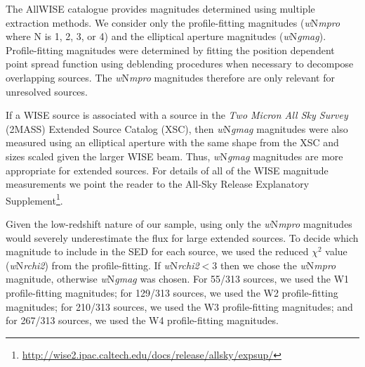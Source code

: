 \documentclass[fleqn, usenatbib]{mnras}
\begin{document}
The AllWISE catalogue provides magnitudes determined using multiple extraction methods. We consider only the profile-fitting magnitudes (\textit{w}N\textit{mpro} where N is 1, 2, 3, or 4) and the elliptical aperture magnitudes (\textit{w}N\textit{gmag}). Profile-fitting magnitudes were determined by fitting the position dependent point spread function using deblending procedures when necessary to decompose overlapping sources. The \textit{w}N\textit{mpro} magnitudes therefore are only relevant for unresolved sources.

If a WISE source is associated with a source in the \textit{Two Micron All Sky Survey} (2MASS) Extended Source Catalog (XSC), then \textit{w}N\textit{gmag} magnitudes were also measured using an elliptical aperture with the same shape from the XSC and sizes scaled given the larger WISE beam. Thus, \textit{w}N\textit{gmag} magnitudes are more appropriate for extended sources. For details of all of the WISE magnitude measurements we point the reader to the All-Sky Release Explanatory Supplement\footnote{\url{http://wise2.ipac.caltech.edu/docs/release/allsky/expsup/}}.

Given the low-redshift nature of our sample, using only the \textit{w}N\textit{mpro} magnitudes would severely underestimate the flux for large extended sources. To decide which magnitude to include in the SED for each source, we used the reduced $\chi^{2}$ value (\textit{w}N\textit{rchi2}) from the profile-fitting. If \textit{w}N\textit{rchi2}$<3$ then we chose the \textit{w}N\textit{mpro} magnitude, otherwise \textit{w}N\textit{gmag} was chosen. For 55/313 sources, we used the W1 profile-fitting magnitudes; for 129/313 sources, we used the W2 profile-fitting magnitudes; for 210/313 sources, we used the W3 profile-fitting magnitudes; and for 267/313 sources, we used the W4 profile-fitting magnitudes.
\end{document}

